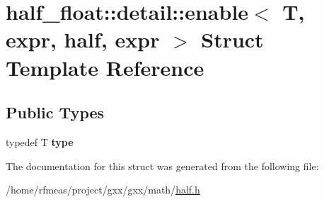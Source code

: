 \hypertarget{structhalf__float_1_1detail_1_1enable_3_01T_00_01expr_00_01half_00_01expr_01_4}{}\section{half\+\_\+float\+:\+:detail\+:\+:enable$<$ T, expr, half, expr $>$ Struct Template Reference}
\label{structhalf__float_1_1detail_1_1enable_3_01T_00_01expr_00_01half_00_01expr_01_4}
\subsection*{Public Types}
\begin{DoxyCompactItemize}
\item 
typedef T {\bfseries type}\hypertarget{structhalf__float_1_1detail_1_1enable_3_01T_00_01expr_00_01half_00_01expr_01_4_a82a85fe2db8508b2e4731c1bcf0edd99}{}\label{structhalf__float_1_1detail_1_1enable_3_01T_00_01expr_00_01half_00_01expr_01_4_a82a85fe2db8508b2e4731c1bcf0edd99}

\end{DoxyCompactItemize}


The documentation for this struct was generated from the following file\+:\begin{DoxyCompactItemize}
\item 
/home/rfmeas/project/gxx/gxx/math/\hyperlink{half_8h}{half.\+h}\end{DoxyCompactItemize}

